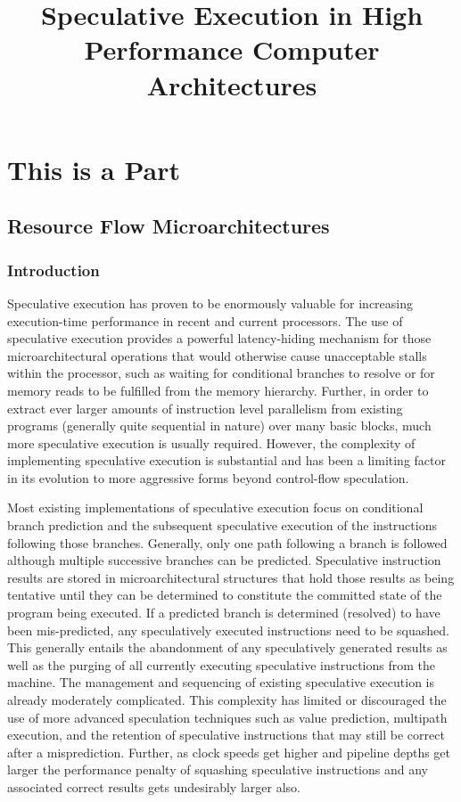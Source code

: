 \documentclass{book}
\begin{document}
\tableofcontents
\listoftables
\listoffigures
\part{This is a Part}
%
\title{Speculative Execution in High Performance Computer Architectures}
%
%
%
%
%
\chapter{Resource Flow Microarchitectures}
%
%
%
%
\section{Introduction}
%
Speculative execution has proven to be enormously valuable for
increasing execution-time performance in recent and current
processors.  The use of speculative execution provides a powerful
latency-hiding mechanism for those microarchitectural operations that
would otherwise cause unacceptable stalls within the processor, such as
waiting for conditional branches to resolve or for memory reads to be
fulfilled from the memory hierarchy.  
Further, in order to extract ever larger amounts of instruction
level parallelism from existing programs (generally quite sequential
in nature) over many basic blocks, much more speculative 
execution is usually required.
However, the complexity of
implementing speculative execution is substantial and has been a
limiting factor in its evolution to more aggressive forms beyond
control-flow speculation.

Most existing implementations of speculative execution focus on
conditional branch prediction and the subsequent speculative execution
of the instructions following those branches.  Generally, only one path
following a branch is followed although multiple successive branches
can be predicted.  Speculative instruction results are stored in
microarchitectural structures that hold those results as being
tentative until they can be determined to constitute the committed
state of the program being executed.  If a predicted branch is
determined (resolved) to have been mis-predicted, any speculatively
executed instructions need to be squashed.  This generally entails the
abandonment of any speculatively generated results as well as the
purging of all currently executing speculative instructions from the
machine.  The management and sequencing of existing speculative
execution is already moderately complicated.  This complexity has
limited or discouraged the use of more advanced speculation techniques
such as value prediction, multipath execution, and the retention of
speculative instructions that may still be correct after a
misprediction.  Further, as clock speeds get higher and pipeline depths
get larger the performance penalty of squashing speculative
instructions and any associated correct results gets undesirably larger
also.
\end{document}
